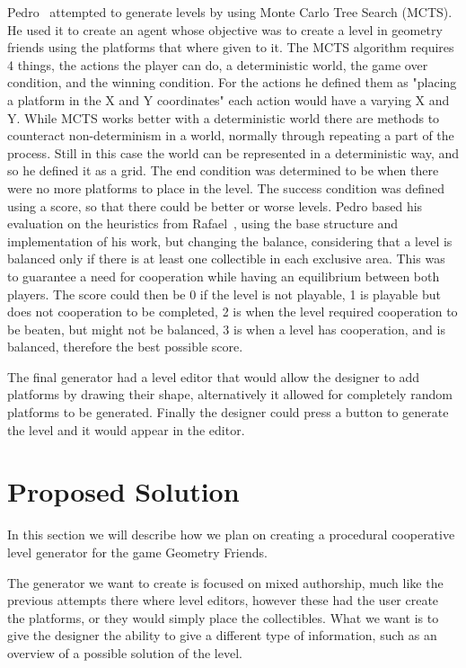 \documentclass[runningheads]{llncs}
\begin{document}
Pedro~\cite{ref_thesispedro} attempted to generate levels by using Monte Carlo Tree Search (MCTS). He used it to create an agent whose objective was to create a level in geometry friends using the platforms that where given to it. The MCTS algorithm requires 4 things, the actions the player can do, a deterministic world, the game over condition, and the winning condition. For the actions he defined them as "placing a platform in the X and Y coordinates" each action would have a varying X and Y. While MCTS works better with a deterministic world there are methods to counteract non-determinism in a world, normally through repeating a part of the process. Still in this case the world can be represented in a deterministic way, and so he defined it as a grid. The end condition was determined to be when there were no more platforms to place in the level. The success condition was defined using a score, so that there could be better or worse levels. Pedro based his evaluation on the heuristics from Rafael~\cite{ref_thesisrafael}, using the base structure and implementation of his work, but changing the balance, considering that a level is balanced only if there is at least one collectible in each exclusive area. This was to guarantee a need for cooperation while having an equilibrium between both players. The score could then be 0 if the level is not playable, 1 is playable but does not cooperation to be completed, 2 is when the level required cooperation to be beaten, but might not be balanced, 3 is when a level has cooperation, and is balanced, therefore the best possible score.

The final generator had a level editor that would allow the designer to add platforms by drawing their shape, alternatively it allowed for completely random platforms to be generated. Finally the designer could press a button to generate the level and it would appear in the editor.

\section{Proposed Solution}
In this section we will describe how we plan on creating a procedural cooperative level generator for the game Geometry Friends.

The generator we want to create is focused on mixed authorship, much like the previous attempts there where level editors, however these had the user create the platforms, or they would simply place the collectibles. What we want is to give the designer the ability to give a different type of information, such as an overview of a possible solution of the level.
\end{document}
